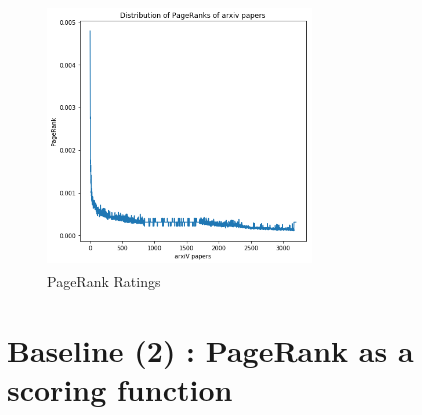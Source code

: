 \documentclass[a4paper, 11pt]{article}
\begin{document}

\begin{figure}[!htb]
    \centering
    \includegraphics[width=7cm,height=7cm]{pagerank-distribution}
    \caption{PageRank Ratings}
    \label{fig:pagerank-distribution}
\end{figure}

\section{Baseline (2) : PageRank as a scoring function}
\end{document}
